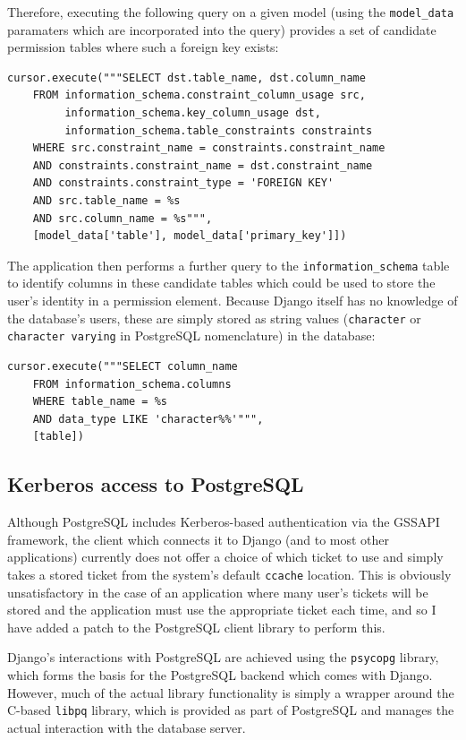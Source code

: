\documentclass{article}
\begin{document}
Therefore, executing the following query on a given model (using the \verb+model_data+ paramaters which are incorporated into the query) provides a set of candidate permission tables where such a foreign key exists:

\begin{verbatim}
cursor.execute("""SELECT dst.table_name, dst.column_name
    FROM information_schema.constraint_column_usage src,
         information_schema.key_column_usage dst,
         information_schema.table_constraints constraints
    WHERE src.constraint_name = constraints.constraint_name
    AND constraints.constraint_name = dst.constraint_name
    AND constraints.constraint_type = 'FOREIGN KEY'
    AND src.table_name = %s
    AND src.column_name = %s""",
    [model_data['table'], model_data['primary_key']])
\end{verbatim}

The application then performs a further query to the \verb+information_schema+ table to identify columns in these candidate tables which could be used to store the user's identity in a permission element. Because Django itself has no knowledge of the database's users, these are simply stored as string values (\texttt{character} or \texttt{character varying} in PostgreSQL nomenclature) in the database:

\begin{verbatim}
cursor.execute("""SELECT column_name
    FROM information_schema.columns
    WHERE table_name = %s
    AND data_type LIKE 'character%%'""",
    [table])
\end{verbatim}

\subsection{Kerberos access to PostgreSQL}
Although PostgreSQL includes Kerberos-based authentication via the GSSAPI framework\cite{postgres-GSSAPI}, the client which connects it to Django (and to most other applications) currently does not offer a choice of which ticket to use and simply takes a stored ticket from the system's default \texttt{ccache} location. This is obviously unsatisfactory in the case of an application where many user's tickets will be stored and the application must use the appropriate ticket each time, and so I have added a patch to the PostgreSQL client library to perform this.

Django's interactions with PostgreSQL are achieved using the \texttt{psycopg} library, which forms the basis for the PostgreSQL backend which comes with Django. However, much of the actual library functionality is simply a wrapper around the C-based \texttt{libpq} library, which is provided as part of PostgreSQL and manages the actual interaction with the database server.
\end{document}
